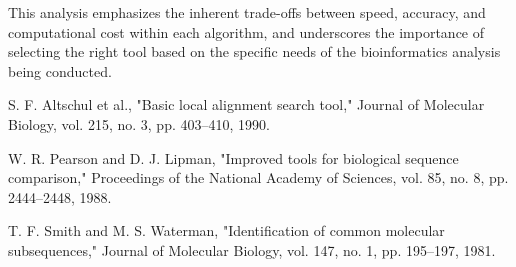 \documentclass{article}
\begin{document}
This analysis emphasizes the inherent trade-offs between speed, accuracy, and computational cost within each algorithm, and underscores the importance of selecting the right tool based on the specific needs of the bioinformatics analysis being conducted.


\begin{thebibliography}{9}
    S. F. Altschul et al., "Basic local alignment search tool," Journal of Molecular Biology, vol. 215, no. 3, pp. 403–410, 1990.

    W. R. Pearson and D. J. Lipman, "Improved tools for biological sequence comparison," Proceedings of the National Academy of Sciences, vol. 85, no. 8, pp. 2444–2448, 1988.

    T. F. Smith and M. S. Waterman, "Identification of common molecular subsequences," Journal of Molecular Biology, vol. 147, no. 1, pp. 195–197, 1981.
\end{thebibliography}
\end{document}

